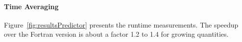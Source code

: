\documentclass{acm_proc_article-sp}
\begin{document}
  





\paragraph{Time Averaging}
Figure~\ref{fig:resultsPredictor} presents the runtime measurements. The speedup over the Fortran version is about a factor 1.2 to 1.4 for growing quantities.
\end{document}
